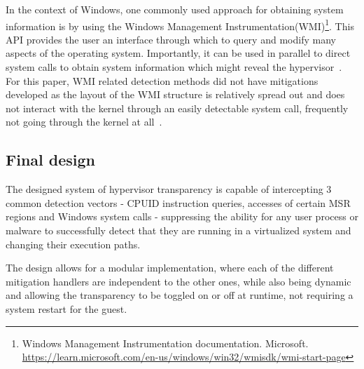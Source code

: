 In the context of Windows, one commonly used approach for obtaining system information is by using the Windows Management Instrumentation(WMI)\footnote{Windows Management Instrumentation documentation. Microsoft. \url{https://learn.microsoft.com/en-us/windows/win32/wmisdk/wmi-start-page}}.
This API provides the user an interface through which to query and modify many aspects of the operating system. 
Importantly, it can be used in parallel to direct system calls to obtain system information which might reveal the hypervisor~\cite{graeber2015abusing}.
For this paper, WMI related detection methods did not have mitigations developed as the layout of the WMI structure is relatively spread out and 
does not interact with the kernel through an easily detectable system call, frequently not going through the kernel at all~\cite{wmi-structure}.

\subsection{Final design}
The designed system of hypervisor transparency is capable of intercepting 3 common detection vectors - CPUID instruction queries, accesses of certain MSR regions and Windows system calls - 
suppressing the ability for any user process or malware to successfully detect that they are running in a virtualized system and changing their execution paths. 

The design allows for a modular implementation, where each of the different mitigation handlers are independent to the other ones, 
while also being dynamic and allowing the transparency to be toggled on or off at runtime, not requiring a system restart for the guest.




